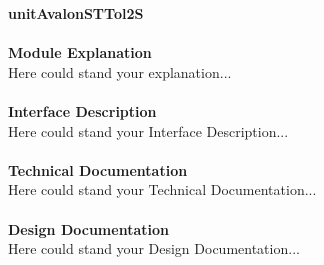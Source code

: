 \documentclass[../../../../doc/ASP-SoC_doc/main.tex]{subfiles}
\begin{document}
\textbf{unitAvalonSTTol2S}
\\\\
\textbf{Module Explanation}
\\
Here could stand your explanation...\\
\\
\textbf{Interface Description}
\\
Here could stand your Interface Description...\\
\\
\textbf{Technical Documentation}
\\
Here could stand your Technical Documentation...\\
\\
\textbf{Design Documentation}
\\
Here could stand your Design Documentation...\\
\\
\end{document}
